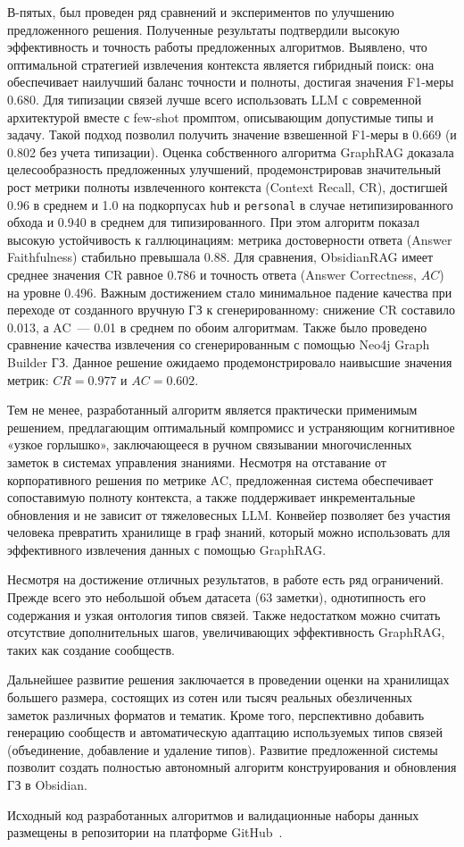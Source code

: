В-пятых, был проведен ряд сравнений и экспериментов по улучшению
предложенного решения.
Полученные результаты подтвердили высокую эффективность и
точность работы предложенных алгоритмов.
Выявлено, что оптимальной стратегией извлечения контекста
является гибридный поиск: она обеспечивает наилучший баланс
точности и полноты,
достигая значения F1-меры 0.680.
Для типизации связей лучше всего использовать LLM с современной архитектурой
вместе с
few-shot промптом, описывающим допустимые типы и задачу.
Такой подход позволил получить значение взвешенной F1-меры
в 0.669 (и 0.802 без учета типизации).
Оценка собственного алгоритма GraphRAG
доказала целесообразность предложенных улучшений, продемонстрировав
значительный рост метрики полноты извлеченного контекста
(Context Recall, CR), достигшей 0.96 в среднем
и 1.0 на подкорпусах \texttt{hub} и \texttt{personal} в случае
нетипизированного обхода и 0.940 в среднем для типизированного.
При этом алгоритм показал высокую устойчивость к галлюцинациям:
метрика достоверности ответа (Answer Faithfulness) стабильно превышала 0.88.
Для сравнения, ObsidianRAG имеет среднее значения CR равное 0.786
и точность ответа (Answer Correctness, $AC$) на уровне 0.496.
Важным достижением стало минимальное падение качества
при переходе от созданного вручную ГЗ
к сгенерированному: снижение CR составило 0.013, а AC~--- 0.01
в среднем по обоим алгоритмам.
Также было проведено сравнение качества извлечения со сгенерированным
с помощью Neo4j Graph Builder ГЗ.
Данное решение ожидаемо
продемонстрировало наивысшие значения метрик:
$CR = 0.977$ и $AC = 0.602$.

Тем не менее, разработанный алгоритм является
практически применимым решением,
предлагающим оптимальный компромисс и
устраняющим когнитивное «узкое горлышко»,
заключающееся в ручном связывании многочисленных заметок
в системах управления знаниями.
Несмотря на отставание от корпоративного решения по метрике
AC, предложенная система обеспечивает сопоставимую
полноту контекста,
а также поддерживает инкрементальные обновления
и не зависит от тяжеловесных LLM.
Конвейер позволяет без участия человека превратить
хранилище в граф знаний, который можно использовать
для эффективного извлечения данных с помощью GraphRAG.

Несмотря на достижение отличных результатов,
в работе есть ряд ограничений.
Прежде всего это небольшой объем датасета (63 заметки),
однотипность его содержания и узкая онтология типов связей.
Также недостатком можно считать отсутствие дополнительных
шагов, увеличивающих эффективность GraphRAG, таких как
создание сообществ.

Дальнейшее развитие решения заключается в
проведении оценки на хранилищах большего размера,
состоящих из сотен или тысяч реальных обезличенных
заметок различных форматов и тематик.
Кроме того, перспективно добавить
генерацию сообществ и автоматическую адаптацию
используемых типов связей (объединение, добавление и удаление типов).
Развитие предложенной системы позволит
создать полностью автономный алгоритм
конструирования и обновления ГЗ в Obsidian.

Исходный код разработанных алгоритмов и валидационные наборы данных
размещены в репозитории на платформе GitHub~\cite{my_github_repo}.
